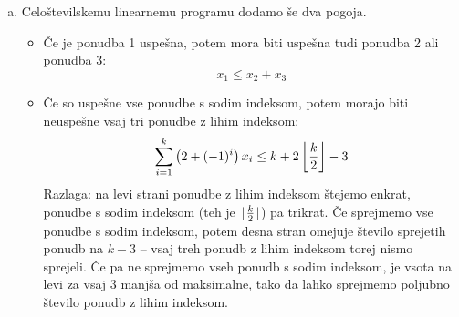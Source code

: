 \begin{naloga}
\begin{odgovor}
\begin{enumerate}[(a)]
\item Celoštevilskemu linearnemu programu dodamo še dva pogoja.
    \begin{itemize}
    \item Če je ponudba 1 uspešna,
    potem mora biti uspešna tudi ponudba 2 ali ponudba 3:
    $$
    x_1 \le x_2 + x_3
    $$
    \item Če so uspešne vse ponudbe s sodim indeksom,
    potem morajo biti ne\-uspeš\-ne vsaj tri ponudbe z lihim indeksom:
    $$
    \sum_{i=1}^{k} \left(2 + (-1)^i\right) x_{i}
    \le k + 2 \left\lfloor {k \over 2} \right\rfloor - 3
    $$
    Razlaga: na levi strani ponudbe z lihim indeksom štejemo enkrat,
    ponudbe s sodim indeksom
    (teh je $\lfloor {k \over 2} \rfloor$)
    pa trikrat.
    Če sprejmemo vse ponudbe s sodim indeksom,
    potem desna stran omejuje število sprejetih ponudb na $k - 3$
    -- vsaj treh ponudb z lihim indeksom torej nismo sprejeli.
    Če pa ne sprejmemo vseh ponudb s sodim indeksom,
    je vsota na levi za vsaj $3$ manjša od maksimalne,
    tako da lahko sprejmemo poljubno število ponudb z lihim indeksom.
    \end{itemize}
\end{enumerate}
\end{odgovor}
\end{naloga}
